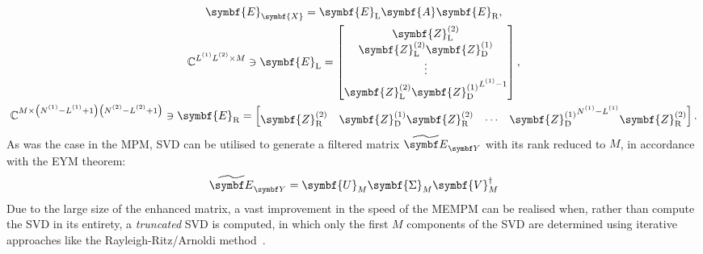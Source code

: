 \begin{subequations}
    \begin{gather}
        \symbf{E}_{\symbf{X}} =
        \symbf{E}_{\text{L}}
        \symbf{A}
        \symbf{E}_{\text{R}},\\
        \mathbb{C}^{\Lone \Ltwo \times M} \ni
        \symbf{E}_{\text{L}} =
        \begin{bmatrix}
            \symbf{Z}^{(2)}_{\text{L}} \\
            \symbf{Z}^{(2)}_{\text{L}} \symbf{Z}^{(1)}_{\text{D}} \\
            \vdots \\
            \symbf{Z}^{(2)}_{\text{L}} {\symbf{Z}^{(1)}_{\text{D}}}^{\Lone - 1} \\
        \end{bmatrix},\label{eq:EL}\\
        \mathbb{C}^{M \times \left(\None - \Lone + 1\right)\left(\Ntwo - \Ltwo + 1\right)} \ni
        \symbf{E}_{\text{R}} =
        \begin{bmatrix}
            \symbf{Z}^{(2)}_{\text{R}} &
            \symbf{Z}^{(1)}_{\text{D}} \symbf{Z}^{(2)}_{\text{R}} &
            \cdots &
            {\symbf{Z}^{(1)}_{\text{D}}}^{\None - \Lone} \symbf{Z}^{(2)}_{\text{R}} \\
        \end{bmatrix}.
    \end{gather}
\end{subequations}
As was the case in the \ac{MPM}, \ac{SVD} can be utilised to generate a
filtered matrix $\EYtilde$ with its rank reduced to $M$, in accordance with the
\ac{EYM} theorem:
\begin{equation}
    \EYtilde =
        \symbf{U}_M^{\vphantom{\dagger}}
        \symbf{\Sigma}_M^{\vphantom{\dagger}}
        \symbf{V}_M^{\dagger}
\end{equation}
Due to the large size of the enhanced matrix, a vast improvement
in the speed of the \ac{MEMPM} can be realised when, rather than compute the
\ac{SVD} in its entirety, a \emph{truncated} \ac{SVD} is computed, in
which only the first $M$ components of the \ac{SVD} are
determined using iterative approaches like the Rayleigh-Ritz/Arnoldi
method~\cite{Arnoldi1951,svds}.


